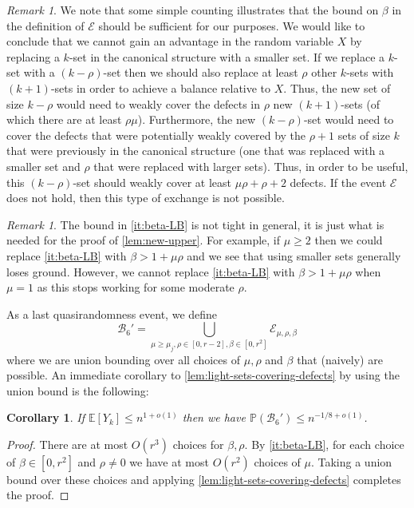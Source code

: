 \documentclass[11pt]{article}
\newtheorem{corollary}[theorem]{Corollary}
\theoremstyle{definition}
\theoremstyle{remark}
\newtheorem{remark}[theorem]{Remark}
\newcommand{\E}{\mathbb{E}}
\newcommand{\PP}{\mathbb{P}}
\newcommand{\cE}{\mathcal{E}}
\newcommand{\cB}{\mathcal{B}}
\begin{document}
\begin{remark}
We note that some simple counting illustrates that the bound on $ \beta$ in 
the definition of $ \cE$ should be sufficient for our purposes. We would like to conclude that 
we cannot gain an advantage in the random variable
$X$ by replacing a $k$-set in the canonical structure with a smaller set. If we replace a $k$-set
with a $(k - \rho)$-set then we should also replace at least $\rho$ other $k$-sets with $(k+1)$-sets in order to achieve a balance relative to $X$. Thus, the
new set of size $ k - \rho$ would need to weakly cover the defects in $ \rho$ new $ (k+1)$-sets (of which
there are at least $ \rho \mu$). Furthermore, the new $ (k-\rho)$-set would need to cover the defects that were potentially weakly covered by the $ \rho +1$ sets of size $k$ that were previously in the canonical structure (one that was replaced with a smaller set and $ \rho$ that were replaced with
larger sets). Thus, in order to be useful, this $ (k -\rho)$-set should weakly cover at least $ \mu \rho + \rho + 2 $ defects. If the event $ \cE$ does not hold, then this type of exchange is not possible. 
\end{remark}

\begin{remark}
    The bound in \cref{it:beta-LB} is not tight in general, it
    is just what is needed for the proof of \cref{lem:new-upper}. For example, 
    if $\mu\ge 2$ then we could replace \cref{it:beta-LB} with $\beta > 1 + \mu \rho$ and we see that using smaller sets generally loses ground.  However, we cannot replace \cref{it:beta-LB} with $\beta > 1 + \mu \rho$ when $\mu= 1$ as this stops working for some moderate $\rho$.
\end{remark}


As a last quasirandomness event, we define $$\cB_6' = \bigcup_{\mu \geq \mu_{j}, \rho \in [0,r - 2],\beta \in [0,r^2]} \cE_{\mu,\rho,\beta}$$
where we are union bounding over all choices of $\mu,\rho$ and $\beta$ that (naively) are possible.  An immediate corollary to \cref{lem:light-sets-covering-defects} by using the union bound is the following:
\begin{corollary}\label{cor:count-covering}
    If $\E [Y_k] \leq n^{1 + o(1)}$ then we have $\PP(\cB_6') \leq n^{-1/8 + o(1)}$.
\end{corollary}
\begin{proof}
    There are at most $O(r^3)$ choices for $\beta,\rho$.  By \cref{it:beta-LB}, for each choice of $\beta \in [0,r^2]$ and $\rho \neq 0$ we have at most $O(r^2)$ choices of $\mu$.  Taking a union bound over these choices and applying \cref{lem:light-sets-covering-defects} completes the proof.
\end{proof}
\end{document}
